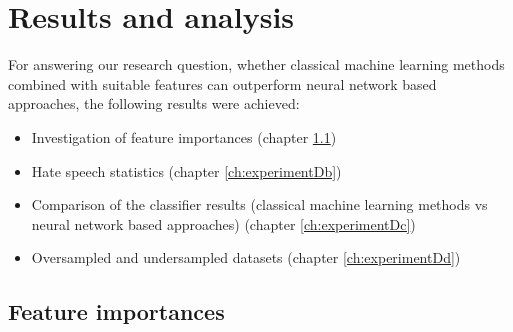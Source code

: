 \section{Results and analysis} \label{analysis}

For answering our research question, whether classical machine learning methods combined with suitable features can outperform neural network based approaches, the following results were achieved:
\begin{itemize}
	\item Investigation of feature importances (chapter \ref{ch:experimentDa})
	\item Hate speech statistics (chapter \ref{ch:experimentDb})
	\item Comparison of the classifier results (classical machine learning methods vs neural network based approaches) (chapter \ref{ch:experimentDc})
	\item Oversampled and undersampled datasets (chapter \ref{ch:experimentDd})
\end{itemize}

\subsection{Feature importances}
\label{ch:experimentDa}

